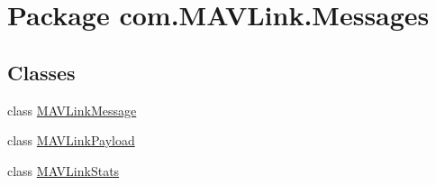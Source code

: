 \hypertarget{namespacecom_1_1MAVLink_1_1Messages}{}\section{Package com.\+M\+A\+V\+Link.\+Messages}
\label{namespacecom_1_1MAVLink_1_1Messages}
\subsection*{Classes}
\begin{DoxyCompactItemize}
\item 
class \mbox{\hyperlink{classcom_1_1MAVLink_1_1Messages_1_1MAVLinkMessage}{M\+A\+V\+Link\+Message}}
\item 
class \mbox{\hyperlink{classcom_1_1MAVLink_1_1Messages_1_1MAVLinkPayload}{M\+A\+V\+Link\+Payload}}
\item 
class \mbox{\hyperlink{classcom_1_1MAVLink_1_1Messages_1_1MAVLinkStats}{M\+A\+V\+Link\+Stats}}
\end{DoxyCompactItemize}
